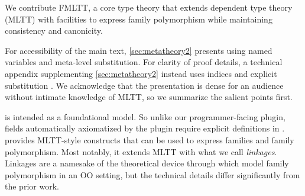 We contribute \ac{FMLTT}, a core type theory that extends
\citeauthor{martin1982constructive} dependent type theory (MLTT)
with facilities to express family polymorphism
while maintaining consistency and canonicity.
%

For accessibility of the main text, \cref{sec:metatheory2} presents \TT using
named variables and meta-level substitution.
For clarity of proof details, a technical appendix supplementing
\cref{sec:metatheory2} instead uses \citeauthor{debruijn1964} indices and explicit substitution \cite{abadi1989subst}.
%
We acknowledge that the presentation is dense for an audience
without intimate knowledge of MLTT, so we summarize the salient points first.


\TT is intended as a foundational model. So unlike our programmer-facing plugin,
fields automatically axiomatized by the plugin require explicit definitions in \TT.
%
\TT provides MLTT-style constructs that can be used to express families and
family polymorphism. %
%
Most notably, it extends MLTT with what we call \emph{linkages}.
Linkages are a namesake of the theoretical device through which \citet{zm2017} model
family polymorphism in an OO setting, but the technical details differ significantly from the prior work.

